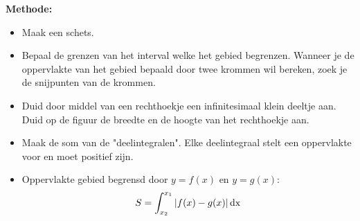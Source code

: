 
\textbf{Methode:}

\begin{itemize}
	\item Maak een schets.
	\item Bepaal de grenzen van het interval welke het gebied begrenzen. Wanneer je de oppervlakte van het gebied bepaald door twee krommen wil bereken, zoek je de snijpunten van de krommen.
	\item Duid door middel van een rechthoekje een infinitesimaal klein deeltje aan. Duid op de figuur de breedte en de hoogte van het rechthoekje aan.
	\item Maak de som van de "deelintegralen". Elke deelintegraal stelt een oppervlakte voor en moet positief zijn.
	\item Oppervlakte gebied begrensd door $y=f(x)$ en  $y=g(x)$:
	\begin{equation*}
	S=\int_{x_2}^{x_1} |f(x)-g(x)| \operatorname{dx}
	\end{equation*}
\end{itemize}


